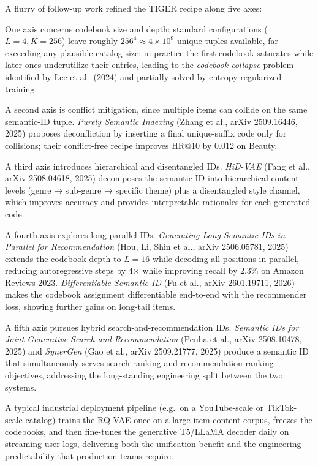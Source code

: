 A flurry of follow-up work refined the TIGER recipe along five axes:

One axis concerns codebook size and depth: standard configurations (\(L=4, K=256\)) leave roughly \(256^4 \approx 4 \times 10^9\) unique tuples available, far exceeding any plausible catalog size; in practice the first codebook saturates while later ones underutilize their entries, leading to the \emph{codebook collapse} problem identified by Lee et al.~(2024) and partially solved by entropy-regularized training.

A second axis is conflict mitigation, since multiple items can collide on the same semantic-ID tuple. \emph{Purely Semantic Indexing} (Zhang et al., arXiv 2509.16446, 2025) proposes deconfliction by inserting a final unique-suffix code only for collisions; their conflict-free recipe improves HR@10 by 0.012 on Beauty.

A third axis introduces hierarchical and disentangled IDs. \emph{HiD-VAE} (Fang et al., arXiv 2508.04618, 2025) decomposes the semantic ID into hierarchical content levels (genre → sub-genre → specific theme) plus a disentangled style channel, which improves accuracy and provides interpretable rationales for each generated code.

A fourth axis explores long parallel IDs. \emph{Generating Long Semantic IDs in Parallel for Recommendation} (Hou, Li, Shin et al., arXiv 2506.05781, 2025) extends the codebook depth to \(L=16\) while decoding all positions in parallel, reducing autoregressive steps by 4× while improving recall by 2.3\% on Amazon Reviews 2023. \emph{Differentiable Semantic ID} (Fu et al., arXiv 2601.19711, 2026) makes the codebook assignment differentiable end-to-end with the recommender loss, showing further gains on long-tail items.

A fifth axis pursues hybrid search-and-recommendation IDs. \emph{Semantic IDs for Joint Generative Search and Recommendation} (Penha et al., arXiv 2508.10478, 2025) and \emph{SynerGen} (Gao et al., arXiv 2509.21777, 2025) produce a semantic ID that simultaneously serves search-ranking and recommendation-ranking objectives, addressing the long-standing engineering split between the two systems.

A typical industrial deployment pipeline (e.g.~on a YouTube-scale or TikTok-scale catalog) trains the RQ-VAE once on a large item-content corpus, freezes the codebooks, and then fine-tunes the generative T5/LLaMA decoder daily on streaming user logs, delivering both the unification benefit and the engineering predictability that production teams require.

